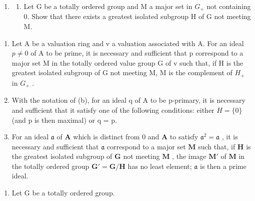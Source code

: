
\begin{enumerate}
\def\labelenumi{\arabic{enumi}.}
\tightlist
\item
  \begin{enumerate}
  \def\labelenumii{(\alph{enumii})}
  \tightlist
  \item
    Let G be a totally ordered group and M a major set in \(G_{+}\) not containing 0. Show that there exists a greatest isolated subgroup H of G not meeting M.
  \end{enumerate}
\end{enumerate}

\begin{enumerate}
\def\labelenumi{(\alph{enumi})}
\setcounter{enumi}{1}
\item
  Let A be a valuation ring and v a valuation associated with A. For an ideal \(p \neq 0\) of A to be prime, it is necessary and sufficient that p correspond to a major set M in the totally ordered value group G of v such that, if H is the greatest isolated subgroup of G not meeting M, M is the complement of \(H_{+}\) in \(G_{+}\) .
\item
  With the notation of (b), for an ideal q of A to be p-primary, it is necessary and sufficient that it satisfy one of the following conditions: either \(H = \{0\}\) (and p is then maximal) or q = p.
\item
  For an ideal \(\mathfrak{a}\) of \(\mathbf{A}\) which is distinct from 0 and \(\mathbf{A}\) to satisfy \(\mathfrak{a}^2 = \mathfrak{a}\) , it is necessary and sufficient that \(\mathfrak{a}\) correspond to a major set \(\mathbf{M}\) such that, if \(\mathbf{H}\) is the greatest isolated subgroup of \(\mathbf{G}\) not meeting \(\mathbf{M}\) , the image \(\mathbf{M}'\) of \(\mathbf{M}\) in the totally ordered group \(\mathbf{G}' = \mathbf{G} / \mathbf{H}\) has no least element; \(\mathfrak{a}\) is then a prime ideal.
\end{enumerate}

\begin{enumerate}
\def\labelenumi{\arabic{enumi}.}
\setcounter{enumi}{1}
\tightlist
\item
  Let G be a totally ordered group.
\end{enumerate}

